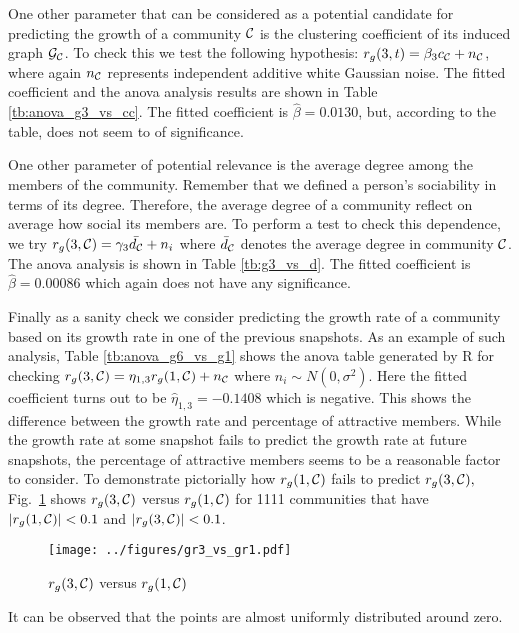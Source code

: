 One other parameter that can be considered as a potential candidate for predicting the growth of a community $\mathcal{C}$ is the clustering coefficient of its  induced graph $\mathcal{G}_{\mathcal{C}}$. To check this we test the following hypothesis: $r_g(3,t) = \beta_3  c_{\mathcal{C}} + n_{\mathcal{C}}$, where again $n_{\mathcal{C}}$ represents independent additive white Gaussian noise. The fitted coefficient and the anova analysis results are shown in Table \ref{tb:anova_g3_vs_cc}.   The fitted coefficient is $\hat{\beta}= 0.0130 $, but, according to the table, does not seem to of significance.


One other parameter of potential relevance is the average degree among the members of the community. Remember that we defined a person's sociability in terms of its degree. Therefore, the average degree of a community reflect on average how social its members are. To perform a test to check this dependence, we try $r_g(3,\mathcal{C}) = \gamma_3  \bar{d_{\mathcal{C}}} + n_i$ where $\bar{d}_{\mathcal{C}}$ denotes the average degree in community $\mathcal{C}$. The anova analysis is shown in Table \ref{tb:g3_vs_d}. The fitted coefficient is $\hat{\beta}=0.00086$ which again does not have any significance.


Finally as a sanity check we consider predicting the growth rate of a community based on its growth rate in one of the previous snapshots.  As an example of such analysis, Table \ref{tb:anova_g6_vs_g1} shows the anova table generated by R for checking $r_g(3,\mathcal{C}) = \eta_{1,3}  r_g(1,\mathcal{C}) + n_{\mathcal{C}}$ where $n_i\sim N(0,\sigma^2)$. Here the fitted coefficient turns out to be $\hat{\eta}_{1,3}=-0.1408$ which is negative. This shows the difference between the growth rate and percentage of attractive members. While the growth rate at some snapshot fails to predict the growth rate at future snapshots, the percentage of attractive members seems to be a reasonable factor to consider. To demonstrate pictorially how $r_g(1,\mathcal{C})$ fails to predict $r_g(3,\mathcal{C}),$ Fig.~\ref{fig:g3_vs_g1} shows $r_g(3,\mathcal{C})$ versus $r_g(1,\mathcal{C})$ for 1111 communities that have $|r_g(1,\mathcal{C})|<0.1$ and $|r_g(3,\mathcal{C})|<0.1$.
\begin{figure}
\begin{center}
\texttt{[image: ../figures/gr3\_vs\_gr1.pdf]}\caption{$r_g(3,\mathcal{C})$ versus $r_g(1,\mathcal{C})$}\label{fig:g3_vs_g1}
\end{center}
\end{figure}
 It can be observed that the points are almost uniformly distributed around zero.




